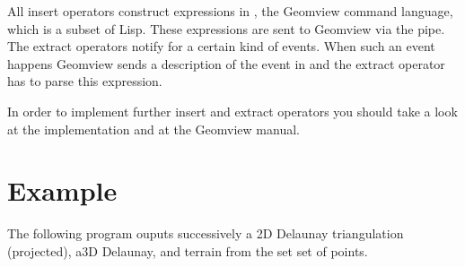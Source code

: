 All insert operators construct expressions in , the Geomview
command language, which is a subset of {\sc Lisp}. These expressions
are sent to Geomview via the pipe. The extract operators notify 
for a certain kind of events. When such an event happens Geomview
sends a description of the event in  and the extract operator has
to parse this expression.

In order to implement further insert and extract operators you should
take a look at the implementation and at the Geomview manual.


\section{Example}
The following program ouputs successively a 2D
  Delaunay triangulation (projected), a3D Delaunay, and terrain
from the set set of points.
